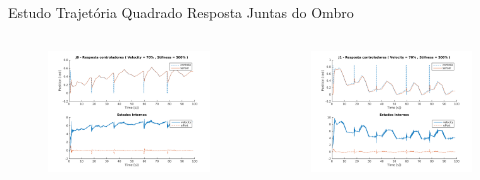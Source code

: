 \documentclass{beamer}
\begin{document}
\begin{frame}{Estudo Trajetória Quadrado}
Resposta Juntas do Ombro
\begin{columns}
\begin{column}{0.5\textwidth}
   \begin{figure}
    \centering
    \includegraphics[width = \linewidth]{tex/figs/squareStiffJ3stateEval_J0v70s500.png}
    \label{fig:mekademo}
\end{figure}
\end{column}
\begin{column}{0.5\textwidth}  %
    \begin{figure}
    \centering
    \includegraphics[width = \linewidth]{tex/figs/squareStiffJ3stateEval_J1v70s500.png}
    \label{fig:mekademo}
\end{figure}
\end{column}
\end{columns}
\end{frame}
\end{document}
